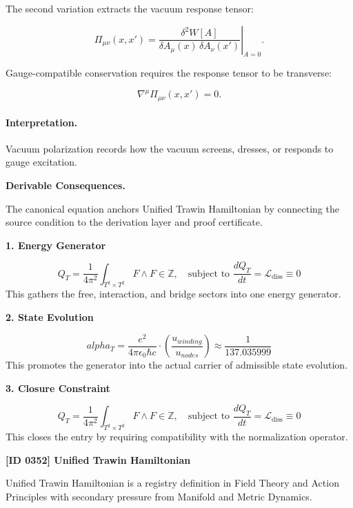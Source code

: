 The second variation extracts the vacuum response tensor:

\begin{equation}
\Pi_{\mu\nu}(x,x')
=
\left.
\frac{\delta^2 W[A]}
{\delta A_\mu(x)\,\delta A_\nu(x')}
\right|_{A=0}.
\end{equation}

Gauge-compatible conservation requires the response tensor to be transverse:

\begin{equation}
\nabla^\mu \Pi_{\mu\nu}(x,x')=0 .
\end{equation}

\paragraph{Interpretation.}
Vacuum polarization records how the vacuum screens, dresses, or responds to gauge excitation.

\par\vspace{0.35em}
\noindent\textbf{Derivable Consequences.}\quad
\begingroup
\footnotesize
\raggedright
The canonical equation anchors Unified Trawin Hamiltonian by connecting the source condition to the derivation layer and proof certificate.
\par\endgroup

\noindent\textbf{1. Energy Generator}\par
\[
Q_T = \frac{1}{4\pi^2} \int_{T^2 \times T^2} F \wedge F \in \mathbb{Z}, \quad \text{subject to } \frac{dQ_T}{dt} = \mathcal{L}_{\text{diss}} \equiv 0
\]
\noindent This gathers the free, interaction, and bridge sectors into one energy generator.\par
\noindent\textbf{2. State Evolution}\par
\[
alpha_T = \frac{e^2}{4\pi\epsilon_0 \hbar c} \cdot \left( \frac{ u_{winding}}{ u_{nodes}} \right) \approx \frac{1}{137.035999}
\]
\noindent This promotes the generator into the actual carrier of admissible state evolution.\par
\noindent\textbf{3. Closure Constraint}\par
\[
Q_T = \frac{1}{4\pi^2} \int_{T^2 \times T^2} F \wedge F \in \mathbb{Z}, \quad \text{subject to } \frac{dQ_T}{dt} = \mathcal{L}_{\text{diss}} \equiv 0
\]
\noindent This closes the entry by requiring compatibility with the normalization operator.\par

\clearpage
\noindent\textbf{[ID 0352] Unified Trawin Hamiltonian}\par
\vspace{0.35em}
\begingroup\small
{}
Unified Trawin Hamiltonian is a registry definition in Field Theory and Action Principles with secondary pressure from Manifold and Metric Dynamics.

